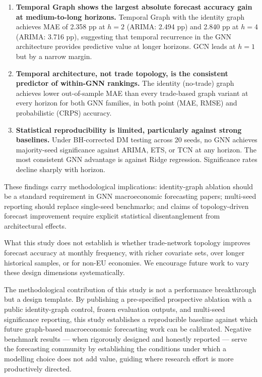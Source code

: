 \documentclass[
]{article}
\providecommand{\tightlist}{%
  \setlength{\itemsep}{0pt}\setlength{\parskip}{0pt}}
\begin{document}
\begin{enumerate}
\def\labelenumi{\arabic{enumi}.}
\tightlist
\item
  \textbf{Temporal Graph shows the largest absolute forecast accuracy gain at medium-to-long horizons.} Temporal Graph with the identity graph achieves MAE of 2.358 pp at $h = 2$ (ARIMA: 2.494 pp) and 2.840 pp at $h = 4$ (ARIMA: 3.716 pp), suggesting that temporal recurrence in the GNN architecture provides predictive value at longer horizons. GCN leads at $h = 1$ but by a narrow margin.
\item
  \textbf{Temporal architecture, not trade topology, is the consistent predictor of within-GNN rankings.} The identity (no-trade) graph achieves lower out-of-sample MAE than every trade-based graph variant at every horizon for both GNN families, in both point (MAE, RMSE) and probabilistic (CRPS) accuracy.
\item
  \textbf{Statistical reproducibility is limited, particularly against strong baselines.} Under BH-corrected DM testing across 20 seeds, no GNN achieves majority-seed significance against ARIMA, ETS, or TCN at any horizon. The most consistent GNN advantage is against Ridge regression. Significance rates decline sharply with horizon.
\end{enumerate}

These findings carry methodological implications: identity-graph ablation should be a standard requirement in GNN macroeconomic forecasting papers; multi-seed reporting should replace single-seed benchmarks; and claims of topology-driven forecast improvement require explicit statistical disentanglement from architectural effects.

What this study does not establish is whether trade-network topology improves forecast accuracy at monthly frequency, with richer covariate sets, over longer historical samples, or for non-EU economies. We encourage future work to vary these design dimensions systematically.

The methodological contribution of this study is not a performance breakthrough but a design template. By publishing a pre-specified prospective ablation with a public identity-graph control, frozen evaluation outputs, and multi-seed significance reporting, this study establishes a reproducible baseline against which future graph-based macroeconomic forecasting work can be calibrated. Negative benchmark results --- when rigorously designed and honestly reported --- serve the forecasting community by establishing the conditions under which a modelling choice does not add value, guiding where research effort is more productively directed.
\end{document}
